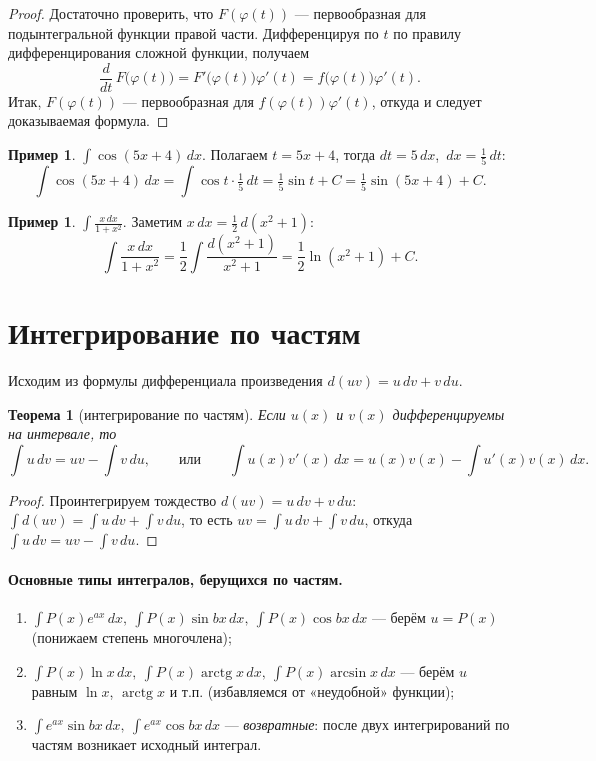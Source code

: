 \documentclass[11pt,a4paper]{article}
\theoremstyle{definition}
\newtheorem{example}[definition]{Пример}
\theoremstyle{plain}
\newtheorem{theorem}[definition]{Теорема}
\DeclareMathOperator{\arctg}{arctg}
\newcommand{\dx}{\,dx}
\newcommand{\dt}{\,dt}
\begin{document}
\begin{proof}
Достаточно проверить, что $F(\varphi(t))$ — первообразная для подынтегральной функции правой
части. Дифференцируя по $t$ по правилу дифференцирования сложной функции, получаем
\[
  \frac{d}{dt}\,F\bigl(\varphi(t)\bigr)=F'\bigl(\varphi(t)\bigr)\varphi'(t)
   =f\bigl(\varphi(t)\bigr)\varphi'(t).
\]
Итак, $F(\varphi(t))$ — первообразная для $f(\varphi(t))\varphi'(t)$, откуда и следует доказываемая
формула.
\end{proof}

\begin{example}
$\displaystyle\int\cos(5x+4)\dx$. Полагаем $t=5x+4$, тогда $dt=5\dx$, $\dx=\tfrac15\dt$:
\[
  \int\cos(5x+4)\dx=\int\cos t\cdot\tfrac15\dt=\tfrac15\sin t+C=\tfrac15\sin(5x+4)+C.
\]
\end{example}

\begin{example}
$\displaystyle\int\frac{x\dx}{1+x^2}$. Заметим $x\dx=\tfrac12\,d(x^2+1)$:
\[
  \int\frac{x\dx}{1+x^2}=\frac12\int\frac{d(x^2+1)}{x^2+1}=\frac12\ln(x^2+1)+C.
\]
\end{example}

\section{Интегрирование по частям}

Исходим из формулы дифференциала произведения $d(uv)=u\,dv+v\,du$.

\begin{theorem}[интегрирование по частям]
Если $u(x)$ и $v(x)$ дифференцируемы на интервале, то
\[
  \int u\,dv = uv-\int v\,du,
  \qquad\text{или}\qquad
  \int u(x)v'(x)\dx=u(x)v(x)-\int u'(x)v(x)\dx.
\]
\end{theorem}

\begin{proof}
Проинтегрируем тождество $d(uv)=u\,dv+v\,du$:
$\int d(uv)=\int u\,dv+\int v\,du$, то есть $uv=\int u\,dv+\int v\,du$, откуда $\int u\,dv=uv-\int v\,du$.
\end{proof}

\paragraph{Основные типы интегралов, берущихся по частям.}
\begin{enumerate}[label=\textbf{(\alph*)},leftmargin=*]
  \item $\displaystyle\int P(x)e^{ax}\dx,\ \int P(x)\sin bx\dx,\ \int P(x)\cos bx\dx$ — берём $u=P(x)$
        (понижаем степень многочлена);
  \item $\displaystyle\int P(x)\ln x\dx,\ \int P(x)\arctg x\dx,\ \int P(x)\arcsin x\dx$ — берём $u$
        равным $\ln x$, $\arctg x$ и т.п. (избавляемся от «неудобной» функции);
  \item $\displaystyle\int e^{ax}\sin bx\dx,\ \int e^{ax}\cos bx\dx$ — \emph{возвратные}: после двух
        интегрирований по частям возникает исходный интеграл.
\end{enumerate}
\end{document}
